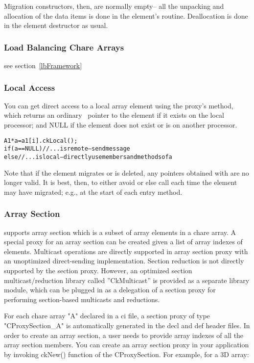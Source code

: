 Migration constructors, then, are normally empty-- all the unpacking
and allocation of the data items is done in the element's  routine.
Deallocation is done in the element destructor as usual.


\subsubsection{Load Balancing Chare Arrays}
see section~\ref{lbFramework}


\subsubsection{Local Access}
\experimental{}
\label{ckLocal for arrays}
You can get direct access to a local array element using the
proxy's  method, which returns an ordinary \CC\ pointer
to the element if it exists on the local processor; and NULL if
the element does not exist or is on another processor.

\begin{alltt}
A1 *a=a1[i].ckLocal();
if (a==NULL) //...is remote-- send message
else //...is local-- directly use members and methods of a
\end{alltt}

Note that if the element migrates or is deleted, any pointers 
obtained with  are no longer valid.  It is best,
then, to either avoid  or else call  
each time the element may have migrated; e.g., at the start 
of each entry method.


\subsubsection{Array Section}
\experimental{}
\label{array section}

\charmpp{} supports array section which is a subset of array 
elements in a chare array.
A special proxy for an array section can be created given a list of array
indexes of elements.
Multicast operations are directly supported in array section proxy with
an unoptimized direct-sending implementation.
Section reduction is not directly supported by the section proxy. 
However, an optimized section multicast/reduction 
library called ''CkMulticast'' is provided as a separate library module,
which can be plugged in as a delegation of a section proxy for performing
section-based multicasts and reductions. 

For each chare array "A" declared in a ci file, a section proxy 
of type "CProxySection\_A" is automatically generated in the decl and def 
header files. 
In order to create an array section, a user needs to provide array indexes 
of all the array section members.
You can create an array section proxy in your application by 
invoking ckNew() function of the CProxySection.
For example, for a 3D array:

